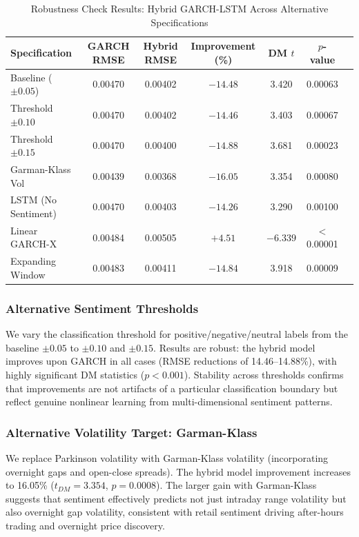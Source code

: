 \begin{table}[htbp]
    \centering
    \footnotesize
    \caption{Robustness Check Results: Hybrid GARCH-LSTM Across Alternative Specifications}
    \label{tab:robustness_results}
    \begin{tabular}{lcccccc}
        \toprule
        Specification & GARCH RMSE & Hybrid RMSE & Improvement (\%) & DM $t$ & $p$-value \\
        \midrule
        Baseline ($\pm 0.05$) & 0.00470 & 0.00402 & $-14.48$ & 3.420 & 0.00063 \\
        Threshold $\pm 0.10$ & 0.00470 & 0.00402 & $-14.46$ & 3.403 & 0.00067 \\
        Threshold $\pm 0.15$ & 0.00470 & 0.00400 & $-14.88$ & 3.681 & 0.00023 \\
        Garman-Klass Vol & 0.00439 & 0.00368 & $-16.05$ & 3.354 & 0.00080 \\
        LSTM (No Sentiment) & 0.00470 & 0.00403 & $-14.26$ & 3.290 & 0.00100 \\
        Linear GARCH-X & 0.00484 & 0.00505 & $+4.51$ & $-6.339$ & $<$0.00001 \\
        Expanding Window & 0.00483 & 0.00411 & $-14.84$ & 3.918 & 0.00009 \\
        \bottomrule
    \end{tabular}
\end{table}

\subsubsection{Alternative Sentiment Thresholds}

We vary the classification threshold for positive/negative/neutral labels from the baseline $\pm 0.05$ to $\pm 0.10$ and $\pm 0.15$. Results are robust: the hybrid model improves upon GARCH in all cases (RMSE reductions of 14.46--14.88\%), with highly significant DM statistics ($p < 0.001$). Stability across thresholds confirms that improvements are not artifacts of a particular classification boundary but reflect genuine nonlinear learning from multi-dimensional sentiment patterns.

\subsubsection{Alternative Volatility Target: Garman-Klass}

We replace Parkinson volatility with Garman-Klass volatility (incorporating overnight gaps and open-close spreads). The hybrid model improvement increases to 16.05\% ($t_{DM} = 3.354$, $p = 0.0008$). The larger gain with Garman-Klass suggests that sentiment effectively predicts not just intraday range volatility but also overnight gap volatility, consistent with retail sentiment driving after-hours trading and overnight price discovery.

